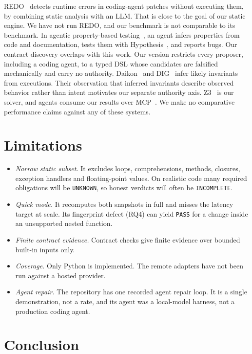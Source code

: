 \documentclass[10pt,twocolumn]{article}
\newcommand{\res}[1]{\texttt{\small #1}}
\begin{document}
REDO~\cite{li2024redo} detects runtime errors in coding-agent patches without executing them, by combining static
analysis with an LLM. That is close to the goal of our static engine. We have not run REDO, and our benchmark is not
comparable to its benchmark. In agentic property-based testing~\cite{maaz2025agentic,anthropic2026pbt}, an agent infers
properties from code and documentation, tests them with Hypothesis~\cite{maciver2019hypothesis}, and reports bugs. Our
contract discovery overlaps with this work. Our version restricts every proposer, including a coding agent, to a typed
DSL whose candidates are falsified mechanically and carry no authority. Daikon~\cite{ernst2007daikon} and
DIG~\cite{nguyen2014dig,dig_repo} infer likely invariants from executions. Their observation that inferred invariants
describe observed behavior rather than intent motivates our separate authority axis. Z3~\cite{demoura2008z3} is our
solver, and agents consume our results over MCP~\cite{mcp2025transports}. We make no comparative performance claims
against any of these systems.

\section{Limitations}

\begin{itemize}
\item \emph{Narrow static subset.} It excludes loops, comprehensions, methods, closures, exception handlers and
  floating-point values. On realistic code many required obligations will be \res{UNKNOWN}, so honest verdicts will often
  be \res{INCOMPLETE}.
\item \emph{Quick mode.} It recomputes both snapshots in full and misses the latency target at scale. Its fingerprint
  defect (RQ4) can yield \res{PASS} for a change inside an unsupported nested function.
\item \emph{Finite contract evidence.} Contract checks give finite evidence over bounded built-in inputs only.
\item \emph{Coverage.} Only Python is implemented. The remote adapters have not been run against a hosted provider.
\item \emph{Agent repair.} The repository has one recorded agent repair loop. It is a single demonstration, not a rate,
  and its agent was a local-model harness, not a production coding agent.
\end{itemize}

\section{Conclusion}
\end{document}
